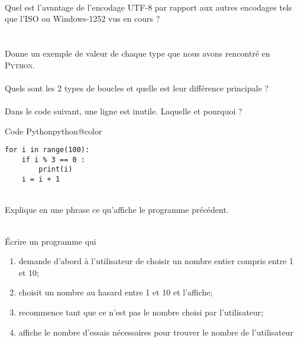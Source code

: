 \documentclass[a4paper,10pt,french]{article}
\begin{document}
\\

Quel est l'avantage de l'encodage UTF-8 par rapport aux autres encodages tels que l'ISO ou Windows-1252 vus en cours ?\\

 \\


\\

Donne un exemple de valeur de chaque type que nous avons rencontré en \textsc{Python}.\\

 \\

Quels sont les 2 types de boucles et quelle est leur différence principale ? \\

 \\

Dans le code suivant, une ligne est inutile. Laquelle et pourquoi ?

\begin{encadrecolore}{Code Python}{python@color}
\begin{verbatim}
for i in range(100):
    if i % 3 == 0 :
        print(i)
    i = i + 1
\end{verbatim}
\end{encadrecolore}

 \\

Explique en une phrase ce qu'affiche le programme précédent.\\

 \\


\newpage 


Écrire un programme qui 
\begin{enumerate}[--]
	\item 	demande d'abord à l'utilisateur de choisir un nombre entier compris entre 1 et 10;
	\item 	choisit un nombre au hasard entre 1 et 10 et l'affiche;
	\item 	recommence tant que ce n'est pas le nombre choisi par l'utilisateur;
	\item 	affiche le nombre d'essais nécessaires pour trouver le nombre de l'utilisateur
\end{enumerate}
\end{document}

